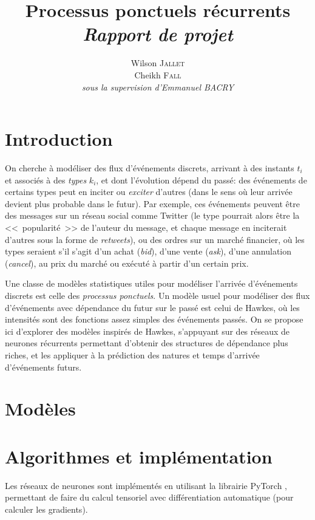 \documentclass[11pt]{article}
\title{\textbf{Processus ponctuels récurrents}\\
	\textit{Rapport de projet}  
}
\author{
  Wilson \textsc{Jallet}\\
  Cheikh \textsc{Fall}\\
  \textit{sous la supervision d'Emmanuel BACRY}
}
\begin{document}
\maketitle

\section{Introduction}

On cherche à modéliser des flux d'événements discrets, arrivant à des instants $t_i$ et associés à des \textit{types} $k_i$, et dont l'évolution dépend du passé: des événements de certains types peut en inciter ou \textit{exciter} d'autres (dans le sens où leur arrivée devient plus probable dans le futur). Par exemple, ces événements peuvent être des messages sur un réseau social comme Twitter (le type pourrait alors être la <<~popularité~>> de l'auteur du message, et chaque message en inciterait d'autres sous la forme de \textit{retweets}), ou des ordres sur un marché financier, où les types seraient s'il s'agit d'un achat (\textit{bid}), d'une vente (\textit{ask}), d'une annulation (\textit{cancel}), au prix du marché ou exécuté à partir d'un certain prix.

Une classe de modèles statistiques utiles pour modéliser l'arrivée d'événements discrets est celle des \textit{processus ponctuels}. Un modèle usuel pour modéliser des flux d'événements avec dépendance du futur sur le passé est celui de Hawkes, où les intensités sont des fonctions assez simples des événements passés. On se propose ici d'explorer des modèles inspirés de Hawkes, s'appuyant sur des réseaux de neurones récurrents permettant d'obtenir des structures de dépendance plus riches, et les appliquer à la prédiction des natures et temps d'arrivée d'événements futurs.

\section{Modèles}




\section{Algorithmes et implémentation}

Les réseaux de neurones sont implémentés en utilisant la librairie \textsf{PyTorch} \cite{paszke2017automatic}, permettant de faire du calcul tensoriel avec différentiation automatique (pour calculer les gradients).
\end{document}
